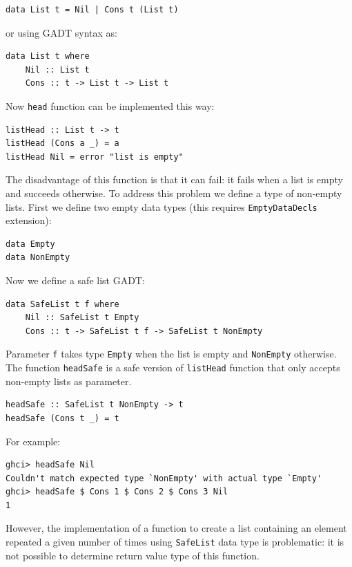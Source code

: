 \documentclass{tmr}
\begin{document}
\begin{Verbatim}
data List t = Nil | Cons t (List t)
\end{Verbatim}

or using GADT syntax as:

\begin{Verbatim}
data List t where
    Nil :: List t
    Cons :: t -> List t -> List t
\end{Verbatim}

Now \verb|head| function can be implemented this way:

\begin{Verbatim}
listHead :: List t -> t
listHead (Cons a _) = a
listHead Nil = error "list is empty"
\end{Verbatim}

The disadvantage of this function is that it can fail: it fails when a list is empty and succeeds otherwise. To address this problem we define a type of non-empty lists. First we define two empty data types (this requires \verb|EmptyDataDecls| extension):

\begin{Verbatim}
data Empty
data NonEmpty
\end{Verbatim}

Now we define a safe list GADT:

\begin{Verbatim}
data SafeList t f where
    Nil :: SafeList t Empty
    Cons :: t -> SafeList t f -> SafeList t NonEmpty
\end{Verbatim}

Parameter \verb|f| takes type \verb|Empty| when the list is empty and \verb|NonEmpty| otherwise. The function \verb|headSafe| is a safe version of \verb|listHead| function that only accepts non-empty lists as parameter.

\begin{Verbatim}
headSafe :: SafeList t NonEmpty -> t
headSafe (Cons t _) = t
\end{Verbatim}

For example:

\begin{Verbatim}
ghci> headSafe Nil
Couldn't match expected type `NonEmpty' with actual type `Empty'
ghci> headSafe $ Cons 1 $ Cons 2 $ Cons 3 Nil
1
\end{Verbatim}

However, the implementation of a function to create a list containing an element repeated a given number of times using \verb|SafeList| data type is problematic: it is not possible to determine return value type of this function.
\end{document}
